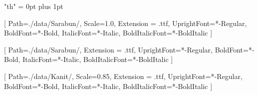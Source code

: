 
\usepackage{xunicode}
\usepackage{xltxtra}
\XeTeXlinebreaklocale "th"
\XeTeXlinebreakskip = 0pt plus 1pt

\usepackage[Latin,Thai]{ucharclasses}

\usepackage{polyglossia}
\setdefaultlanguage{english}


\setsansfont{Sarabun}[
    Path=./data/Sarabun/,
    Scale=1.0,
    Extension = .ttf,
    UprightFont=*-Regular,
    BoldFont=*-Bold,
    ItalicFont=*-Italic,
    BoldItalicFont=*-BoldItalic
    ]

[
    Path=./data/Sarabun/,
    Extension = .ttf,
    UprightFont=*-Regular,
    BoldFont=*-Bold,
    ItalicFont=*-Italic,
    BoldItalicFont=*-BoldItalic
    ]


\setmonofont{Kanit}[
    Path=./data/Kanit/,
    Scale=0.85,
    Extension = .ttf,
    UprightFont=*-Regular,
    BoldFont=*-Bold,
    ItalicFont=*-Italic,
    BoldItalicFont=*-BoldItalic
    ]
    
    
    